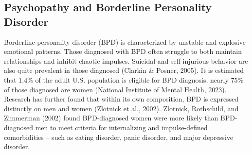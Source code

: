 \documentclass[
  man,floatsintext]{apa7}
\begin{document}
\hypertarget{psychopathy-and-borderline-personality-disorder}{%
\subsection{Psychopathy and Borderline Personality Disorder}\label{psychopathy-and-borderline-personality-disorder}}

Borderline personality disorder (BPD) is characterized by unstable and explosive emotional patterns. Those diagnosed with BPD often struggle to both maintain relationships and inhibit chaotic impulses. Suicidal and self-injurious behavior are also quite prevalent in those diagnosed (Clarkin \& Posner, 2005). It is estimated that 1.4\% of the adult U.S. population is eligible for BPD diagnosis; nearly 75\% of those diagnosed are women (National Institute of Mental Health, 2023). Research has further found that within its own composition, BPD is expressed distinctly on men and women (Zlotnick et al., 2002). Zlotnick, Rothschild, and Zimmerman (2002) found BPD-diagnosed women were more likely than BPD-diagnosed men to meet criteria for internalizing and impulse-defined comorbidities -- such as eating disorder, panic disorder, and major depressive disorder.
\end{document}
